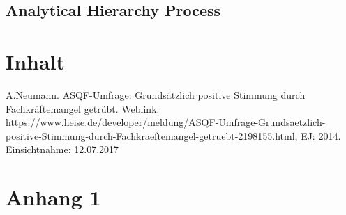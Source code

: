 \documentclass[a4paper, 11pt]{article}
\makeatletter
\newcounter{pos}
\newcommand*{\appendixtoc}{%
	\begingroup
	\edef\@alltocdepth{\the\value{tocdepth}}%
	\setcounter{tocdepth}{-10000}%
	\renewcommand*{\contentsname}{%
		Verzeichnis der Anh\"ange}%
	\renewcommand*{\appendixattoc}{%
		\setcounter{tocdepth}{\@alltocdepth}%
	}%
	\tableofcontents%
	\setcounter{tocdepth}{\@alltocdepth}%
	\endgroup
}
\newcommand*{\appendixattoc}{%
}
\makeatother
\begin{document}
\subsection{Analytical Hierarchy Process}
\section{Inhalt}
\newpage
\begin{thebibliography}{sotief}
	A.Neumann. ASQF-Umfrage: Grundsätzlich positive Stimmung durch Fachkräftemangel getrübt. Weblink:
	https://www.heise.de/developer/meldung/ASQF-Umfrage-Grundsaetzlich-positive-Stimmung-durch-Fachkraeftemangel-getruebt-2198155.html, EJ: 2014. Einsichtnahme: 12.07.2017
\end{thebibliography}
\newpage
\appendix
\appendixtoc
\newpage
\section{Anhang 1} 
\end{document}
